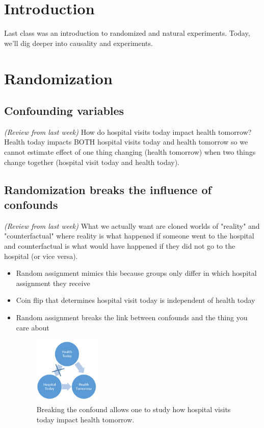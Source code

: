 \section{Introduction}
Last class was an introduction to randomized and natural experiments. Today, we'll dig deeper into causality and experiments.
\section{Randomization}
\subsection{Confounding variables}
\textit{(Review from last week) }
How do hospital visits today impact health tomorrow? Health today impacts BOTH hospital visits today and health tomorrow so we cannot estimate effect of one thing changing (health tomorrow) when two things change together (hospital visit today and health today).
\subsection{Randomization breaks the influence of confounds}
\textit{(Review from last week)}
What we actually want are cloned worlds of "reality" and "counterfactual" where reality is what happened if someone went to the hospital and counterfactual is what would have happened if they did not go to the hospital (or vice versa).  
\begin{itemize}
\item Random assignment mimics this because groups only differ in which hospital assignment they receive 
\item Coin flip that determines hospital visit today is independent of health today
\item Random assignment breaks the link between confounds and the thing you care about
\begin{figure}[ht]
 \begin{center}
   \includegraphics[width=0.3\textwidth]{Figures/Figure_2.PNG}
    \caption{
    Breaking the confound allows one to study how hospital visits today impact health tomorrow.}
    \label{fig:Figure_2}
  \end{center}
\end{figure}
\end{itemize}
